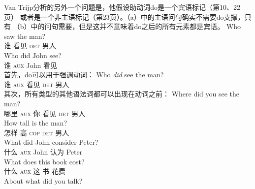 Van Trijp分析的另外一个问题是，他假设助动词do是一个宾语标记（第10、22页） 或者是一个非主语标记（第23页）。（a）中的主语问句确实不需要do支撑，只有 （b）中的问句需要，但是这并不意味着do之后的所有元素都是宾语。
\eal
\ex 
\gll Who saw the man?\\  
     谁 看见 \textsc{det} 男人\\
\ex 
\gll Who did John see?\\  
     谁 \textsc{aux} John 看见\\
\zl
首先，do可以用于强调动词：
\ea
\gll Who \emph{did} see the man?\\  
     谁 \textsc{aux} 看见 \textsc{det} 男人\\
\z
其次，所有类型的其他语法词都可以出现在动词之前：
\eal
\settowidth{}
\ex
\gll Where did you see the man?\\    
     哪里 \textsc{aux} 你 看见 \textsc{det} 男人\\
\ex 
\gll How tall is the man?\\     
     怎样 高 \textsc{cop} \textsc{det} 男人\\
\ex
\gll What did John consider Peter?\\     
     什么 \textsc{aux} John 认为 Peter\\ 
\ex 
\gll What does this book cost?\\
     什么 \textsc{aux} 这 书 花费\\       
\ex 
\gll About what did you talk?\\       
